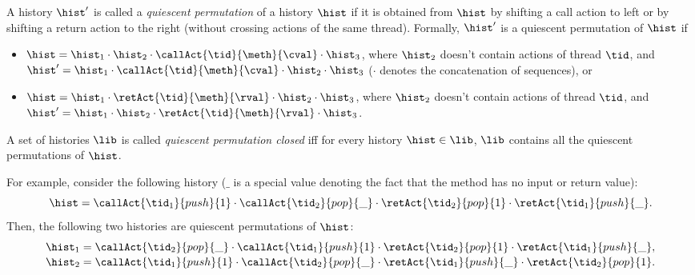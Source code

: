 A history $\hist'$ is called a \emph{quiescent permutation} of a history $\hist$ if it is obtained from $\hist$ by shifting a call action to left or by shifting a return action to the right (without crossing actions of the same thread).
Formally, $\hist'$ is a quiescent permutation of $\hist$ if 
\begin{itemize}
	\item %
	$\hist=\hist_1\cdot \hist_2\cdot \callAct{\tid}{\meth}{\cval}\cdot \hist_3$, where $\hist_2$ doesn't contain actions of thread $\tid$, and $\hist'=\hist_1\cdot \callAct{\tid}{\meth}{\cval}\cdot \hist_2\cdot  \hist_3$ ($\cdot$ denotes the concatenation of sequences), or
	\item %
	$\hist=\hist_1\cdot \retAct{\tid}{\meth}{\rval}\cdot\hist_2\cdot \hist_3$, where $\hist_2$ doesn't contain actions of thread $\tid$, and $\hist'=\hist_1\cdot \hist_2\cdot \retAct{\tid}{\meth}{\rval}\cdot \hist_3$.
\end{itemize}
A set of histories $\lib$ is called \emph{quiescent permutation closed} iff for every history $\hist\in \lib$, $\lib$ contains all the quiescent permutations of $\hist$.

For example, consider the following history ($\_$ is a special value denoting the fact that the method has no input or return value):
{\small
\[
\hist=\callAct{\tid_1}{push}{1}\cdot \callAct{\tid_2}{pop}{\_}\cdot \retAct{\tid_2}{pop}{1}\cdot \retAct{\tid_1}{push}{\_}.
\]}
Then, the following two histories are quiescent permutations of $\hist$:
{\small
\[
\begin{array}{l}
\hist_1=\callAct{\tid_2}{pop}{\_}\cdot \callAct{\tid_1}{push}{1}\cdot \retAct{\tid_2}{pop}{1}\cdot \retAct{\tid_1}{push}{\_},\\[.5mm]
\hist_2=\callAct{\tid_1}{push}{1}\cdot \callAct{\tid_2}{pop}{\_}\cdot \retAct{\tid_1}{push}{\_} \cdot \retAct{\tid_2}{pop}{1}.
\end{array}
\]}

